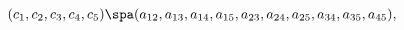 \begin{equation}
(c_1,c_2,c_3,c_4,c_5) \spa 
(a_{12},a_{13},a_{14},a_{15},a_{23},a_{24},a_{25},a_{34},a_{35},a_{45}),
\end{equation}

